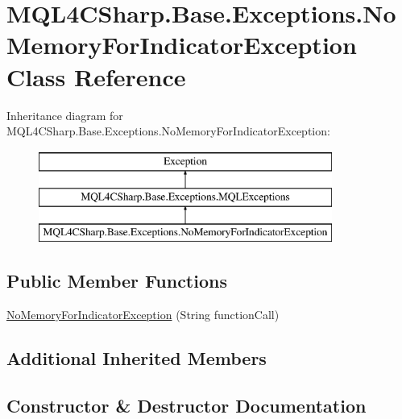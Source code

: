 \hypertarget{class_m_q_l4_c_sharp_1_1_base_1_1_exceptions_1_1_no_memory_for_indicator_exception}{}\section{M\+Q\+L4\+C\+Sharp.\+Base.\+Exceptions.\+No\+Memory\+For\+Indicator\+Exception Class Reference}
\label{class_m_q_l4_c_sharp_1_1_base_1_1_exceptions_1_1_no_memory_for_indicator_exception}
Inheritance diagram for M\+Q\+L4\+C\+Sharp.\+Base.\+Exceptions.\+No\+Memory\+For\+Indicator\+Exception\+:\begin{figure}[H]
\begin{center}
\leavevmode
\includegraphics[height=3.000000cm]{class_m_q_l4_c_sharp_1_1_base_1_1_exceptions_1_1_no_memory_for_indicator_exception}
\end{center}
\end{figure}
\subsection*{Public Member Functions}
\begin{DoxyCompactItemize}
\item 
\hyperlink{class_m_q_l4_c_sharp_1_1_base_1_1_exceptions_1_1_no_memory_for_indicator_exception_a20d4754b6b4a781df5646bb096a06434}{No\+Memory\+For\+Indicator\+Exception} (String function\+Call)
\end{DoxyCompactItemize}
\subsection*{Additional Inherited Members}


\subsection{Constructor \& Destructor Documentation}
